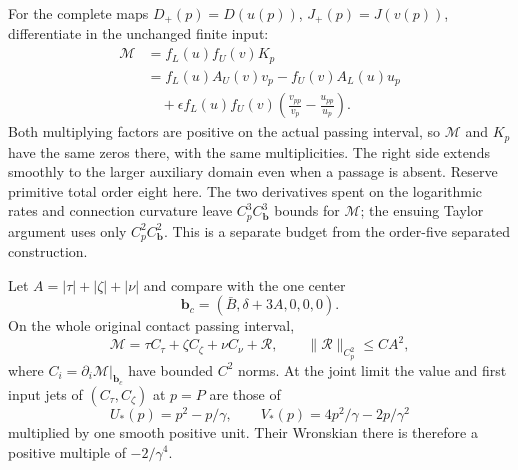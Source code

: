 For the complete maps $D_+(p)=D(u(p))$, $J_+(p)=J(v(p))$,
differentiate in the unchanged finite input:
\begin{equation}\label{rw:joint:contact-numerator}
\begin{split}
 \mathcal M
 &=f_L(u)f_U(v)K_p\\
 &=f_L(u)A_U(v)v_p-f_U(v)A_L(u)u_p\\
 &\quad+\epsilon f_L(u)f_U(v)
             \left(\frac{v_{pp}}{v_p}-\frac{u_{pp}}{u_p}\right).
\end{split}
\end{equation}
Both multiplying factors are positive on the actual passing interval,
so $\mathcal M$ and $K_p$ have the same zeros there, with the same
multiplicities. The right side extends smoothly to the larger auxiliary
domain even when a passage is absent. Reserve primitive total order
eight here. The two derivatives spent on the logarithmic rates and
connection curvature leave $C_p^3C_{\mathbf b}^3$ bounds for
$\mathcal M$; the ensuing Taylor argument uses only
$C_p^2C_{\mathbf b}^2$. This is a separate budget from the
order-five separated construction.

\begin{proposition}
\label{rw:joint:contact}
Let $A=|\tau|+|\zeta|+|\nu|$ and compare with the one center
\[
 \mathbf b_c=(\bar B,\delta+3A,0,0,0).
\]
On the whole original contact passing interval,
\begin{equation}\label{rw:joint:contact-Taylor}
 \mathcal M=\tau C_\tau+\zeta C_\zeta+\nu C_\nu+\mathcal R,
 \qquad \|\mathcal R\|_{C_p^2}\le CA^2,
\end{equation}
where $C_i=\partial_i\mathcal M|_{\mathbf b_c}$ have bounded
$C^2$ norms. At the joint limit the value and first input jets of
$(C_\tau,C_\zeta)$ at $p=P$ are those of
\begin{equation}\label{rw:joint:contact-columns}
 U_*(p)=p^2-p/\gamma,\qquad
 V_*(p)=4p^2/\gamma-2p/\gamma^2
\end{equation}
multiplied by one smooth positive unit. Their Wronskian there is
therefore a positive multiple of $-2/\gamma^4$.
\end{proposition}

